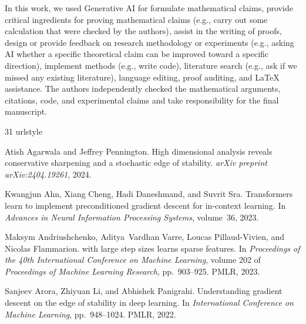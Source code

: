 \documentclass[11pt]{article}
\begin{document}
In this work, we used Generative AI for formulate mathematical claims, provide critical ingredients for proving mathematical claims (e.g., carry out some calculation that were checked by the authors), assist in the writing of proofs, design or provide feedback on research  methodology or experiments (e.g., asking AI whether a specific theoretical claim can be improved toward a specific direction), implement methods (e.g., write code), literature search (e.g., ask if we missed any existing literature), language editing, proof auditing, and \LaTeX{} assistance.  The authors independently checked the mathematical arguments, citations, code, and experimental claims and take responsibility for the final manuscript.

\begin{thebibliography}{31}
\providecommand{\natexlab}[1]{#1}
\providecommand{\url}[1]{\texttt{#1}}
\expandafter\ifx\csname urlstyle\endcsname\relax
  \providecommand{\doi}[1]{doi: #1}\else
  \providecommand{\doi}{doi: \begingroup \urlstyle{rm}\Url}\fi

Atish Agarwala and Jeffrey Pennington.
\newblock High dimensional analysis reveals conservative sharpening and a
  stochastic edge of stability.
\newblock \emph{arXiv preprint arXiv:2404.19261}, 2024.

Kwangjun Ahn, Xiang Cheng, Hadi Daneshmand, and Suvrit Sra.
\newblock Transformers learn to implement preconditioned gradient descent for
  in-context learning.
\newblock In \emph{Advances in Neural Information Processing Systems},
  volume~36, 2023.

Maksym Andriushchenko, Aditya~Vardhan Varre, Loucas Pillaud-Vivien, and Nicolas
  Flammarion.
 with large step sizes learns sparse features.
\newblock In \emph{Proceedings of the 40th International Conference on Machine
  Learning}, volume 202 of \emph{Proceedings of Machine Learning Research},
  pp.\  903--925. PMLR, 2023.

Sanjeev Arora, Zhiyuan Li, and Abhishek Panigrahi.
\newblock Understanding gradient descent on the edge of stability in deep
  learning.
\newblock In \emph{International Conference on Machine Learning}, pp.\
  948--1024. PMLR, 2022.


\end{thebibliography}
\end{document}
